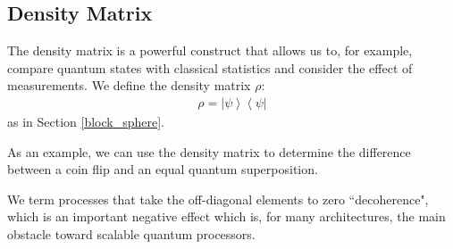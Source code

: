 \documentclass[11pt]{article} %
\newcommand{\bra}[1]{\left\langle #1 \right|}
\newcommand{\ket}[1]{\left|#1\right\rangle}
\begin{document}
\subsection{Density Matrix}
The density matrix is a powerful construct that allows us to, for example, compare quantum states with classical statistics and consider the effect of measurements. We define the density matrix $\rho$:
\begin{align}
    \rho = \ket{\psi}\bra{\psi}
\end{align}
as in Section \ref{block_sphere}.

As an example, we can use the density matrix to determine the difference between a coin flip and an equal quantum superposition.

We term processes that take the off-diagonal elements to zero ``decoherence", which is an important negative effect which is, for many architectures, the main obstacle toward scalable quantum processors.
\end{document}
